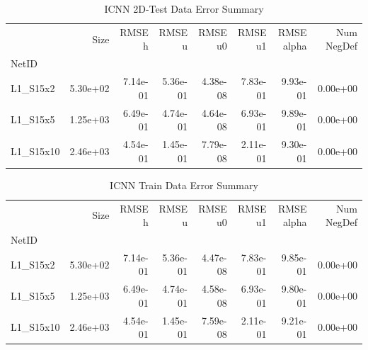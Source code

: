 \documentclass{article}
\theoremstyle{remark}
\numberwithin{equation}{subsection}
\begin{document}
\begin{table}[H]
\begin{tabular}{lrrrrrrr}
	\toprule
	{} &     Size &   RMSE h &   RMSE u &  RMSE u0 &  RMSE u1 &  RMSE alpha &  Num NegDef \\
	NetID     &          &          &          &          &          &             &             \\
	\midrule
	L1\_S15x2  & 5.30e+02 & 7.14e-01 & 5.36e-01 & 4.38e-08 & 7.83e-01 &    9.93e-01 &    0.00e+00 \\
	L1\_S15x5  & 1.25e+03 & 6.49e-01 & 4.74e-01 & 4.64e-08 & 6.93e-01 &    9.89e-01 &    0.00e+00 \\
	L1\_S15x10 & 2.46e+03 & 4.54e-01 & 1.45e-01 & 7.79e-08 & 2.11e-01 &    9.30e-01 &    0.00e+00 \\
	\bottomrule
\end{tabular}

\caption{ICNN 2D-Test Data Error Summary}
\end{table}

\begin{table}[H]
	
\begin{tabular}{lrrrrrrr}
	\toprule
	{} &     Size &   RMSE h &   RMSE u &  RMSE u0 &  RMSE u1 &  RMSE alpha &  Num NegDef \\
	NetID     &          &          &          &          &          &             &             \\
	\midrule
	L1\_S15x2  & 5.30e+02 & 7.14e-01 & 5.36e-01 & 4.47e-08 & 7.83e-01 &    9.85e-01 &    0.00e+00 \\
	L1\_S15x5  & 1.25e+03 & 6.49e-01 & 4.74e-01 & 4.58e-08 & 6.93e-01 &    9.80e-01 &    0.00e+00 \\
	L1\_S15x10 & 2.46e+03 & 4.54e-01 & 1.45e-01 & 7.59e-08 & 2.11e-01 &    9.21e-01 &    0.00e+00 \\
	\bottomrule
\end{tabular}

\caption{ICNN Train Data Error Summary}
\end{table}
\end{document}

